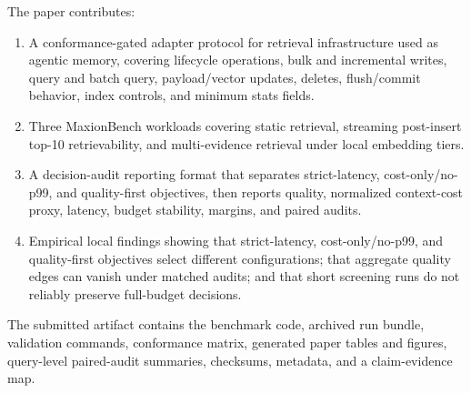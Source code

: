 The paper contributes:
\begin{enumerate}[leftmargin=*]
  \item A conformance-gated adapter protocol for retrieval infrastructure used as agentic memory, covering lifecycle operations, bulk and incremental writes, query and batch query, payload/vector updates, deletes, flush/commit behavior, index controls, and minimum stats fields.
  \item Three MaxionBench workloads covering static retrieval, streaming post-insert top-10 retrievability, and multi-evidence retrieval under local embedding tiers.
  \item A decision-audit reporting format that separates strict-latency, cost-only/no-p99, and quality-first objectives, then reports quality, normalized context-cost proxy, \maxrowp latency, budget stability, margins, and paired audits.
  \item Empirical local findings showing that strict-latency, cost-only/no-p99, and quality-first objectives select different configurations; that aggregate quality edges can vanish under matched audits; and that short screening runs do not reliably preserve full-budget decisions.
\end{enumerate}

The submitted artifact contains the benchmark code, archived run bundle, validation commands, conformance matrix, generated paper tables and figures, query-level paired-audit summaries, checksums, \hotpotmaxionbench{} metadata, and a claim-evidence map.
